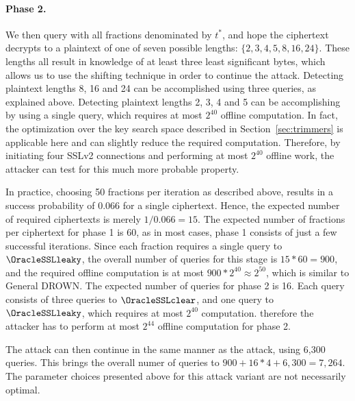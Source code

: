 \paragraph{Phase 2.}
We then query with all fractions
denominated by $t^*$, and hope the ciphertext decrypts to a plaintext of
one of seven possible lengths: $\{2, 3, 4, 5, 8, 16, 24\}$.
These lengths all result in knowledge of at least three least significant bytes,
which allows us to use the shifting technique in order to continue the attack.
Detecting plaintext lengths 8, 16 and 24 can be accomplished using three \tOracleSSLclear
queries, as explained above.
Detecting plaintext lengths 2, 3, 4 and 5 can be accomplishing by using a single
\tOracleSSLleaky query, which requires at most $2^{40}$ offline computation.
In fact, the optimization over the key search space described in
Section~\ref{sec:trimmers} is applicable here and can slightly reduce the required computation.
Therefore, by initiating four SSLv2 connections and performing at most $2^{40}$ offline
work, the attacker can test for this much more probable property.

In practice, choosing 50 fractions per iteration as described above,
results in a success probability of 0.066 for a single ciphertext.
Hence, the expected number of required ciphertexts is merely $1/0.066 = 15$.
The expected number of fractions per ciphertext for phase 1 is 60, as in most cases, phase 1
consists of just a few successful iterations.
Since each fraction requires a single query to $\OracleSSLleaky$,
the overall number of queries for this stage is
$15 * 60 = 900$, and the required offline computation is at most
$900 * 2^{40} \approx 2^{50}$, which is similar to General DROWN\@.
The expected number of queries for phase 2 is 16.
Each query consists of three queries to $\OracleSSLclear$, and one query
to $\OracleSSLleaky$, which requires at most $2^{40}$ computation.
therefore the attacker has to perform at most $2^{44}$ offline computation for phase 2.

The attack can then continue in the same manner as the \tOracleSSLclear attack,
using 6,300 queries. This brings the overall numer of queries to
$ 900 + 16 * 4 + 6,300 = 7,264 $.
The parameter choices presented above for this attack variant are not necessarily optimal.


